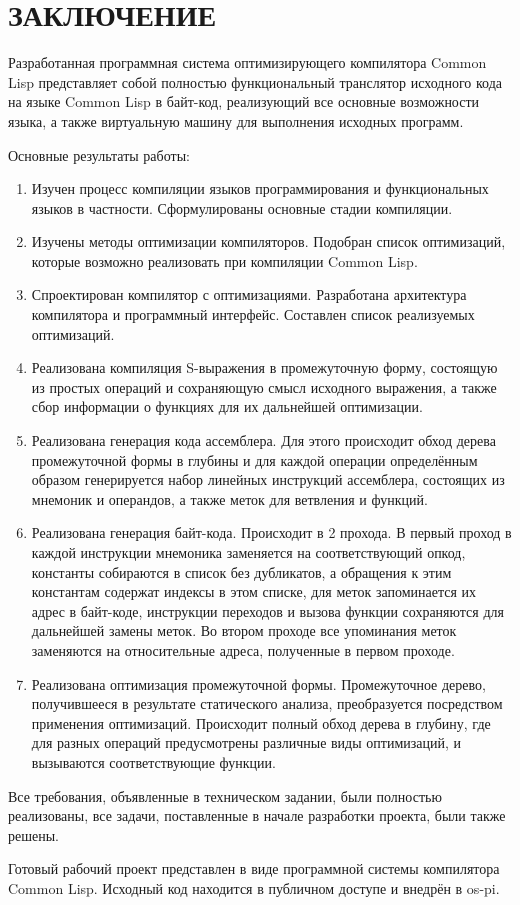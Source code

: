 \section*{ЗАКЛЮЧЕНИЕ}

Разработанная программная система оптимизирующего компилятора Common Lisp представляет собой полностью функциональный транслятор исходного кода на языке Common Lisp в байт-код, реализующий все основные возможности языка, а также виртуальную машину для выполнения исходных программ.

Основные результаты работы:

\begin{enumerate}
\item Изучен процесс компиляции языков программирования и функциональных языков в частности. Сформулированы основные стадии компиляции.
\item Изучены методы оптимизации компиляторов. Подобран список оптимизаций, которые возможно реализовать при компиляции Common Lisp.
\item Спроектирован компилятор с оптимизациями. Разработана архитектура компилятора и программный интерфейс. Составлен список реализуемых оптимизаций.
\item Реализована компиляция S-выражения в промежуточную форму, состоящую из простых операций и сохраняющую смысл исходного выражения, а также сбор информации о функциях для их дальнейшей оптимизации.
\item Реализована генерация кода ассемблера. Для этого происходит обход дерева промежуточной формы в глубины и для каждой операции определённым образом генерируется набор линейных инструкций ассемблера, состоящих из мнемоник и операндов, а также меток для ветвления и функций.
\item Реализована генерация байт-кода. Происходит в 2 прохода. В первый проход в каждой инструкции мнемоника заменяется на соответствующий опкод, константы собираются в список без дубликатов, а обращения к этим константам содержат индексы в этом списке, для меток запоминается их адрес в байт-коде, инструкции переходов и вызова функции сохраняются для дальнейшей замены меток. Во втором проходе все упоминания меток заменяются на относительные адреса, полученные в первом проходе.
\item Реализована оптимизация промежуточной формы. Промежуточное дерево, получившееся в результате статического анализа, преобразуется посредством применения оптимизаций. Происходит полный обход дерева в глубину, где для разных операций предусмотрены различные виды оптимизаций, и вызываются соответствующие функции.
\end{enumerate}

Все требования, объявленные в техническом задании, были полностью реализованы, все задачи, поставленные в начале разработки проекта, были также решены.

Готовый рабочий проект представлен в виде программной системы компилятора Common Lisp. Исходный код находится в публичном доступе и внедрён в os-pi.
